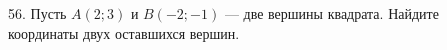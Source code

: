 56. Пусть $A(2;3)$ и $B(-2;-1)$ --- две вершины квадрата. Найдите координаты двух оставшихся вершин.\\

